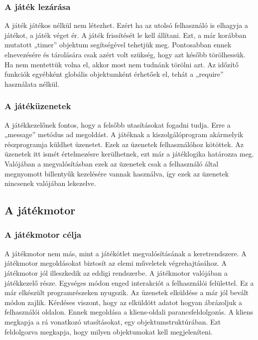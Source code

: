 \documentclass[]{article}
\begin{document}
\hypertarget{a-juxe1tuxe9k-lezuxe1ruxe1sa}{%
\subsubsection{A játék lezárása}\label{a-juxe1tuxe9k-lezuxe1ruxe1sa}}

A játék játékos nélkül nem létezhet. Ezért ha az utolsó felhasználó is
elhagyja a játékot, a játék véget ér. A játék frissítését le kell
állítani. Ezt, a már korábban mutatott „timer'' objektum segítségével
tehetjük meg. Pontosabban ennek elnevezésére és tárolására csak azért
volt szükség, hogy azt később törölhessük. Ha nem mentettük volna el,
akkor most nem tudnánk törölni azt. Az időzítő funkciók egyébként
globális objektumként érhetőek el, tehát a „require'' használata nélkül.

\hypertarget{a-juxe1tuxe9kuxfczenetek}{%
\subsubsection{A játéküzenetek}\label{a-juxe1tuxe9kuxfczenetek}}

A játékkezelőnek fontos, hogy a felsőbb utasításokat fogadni tudja. Erre
a „message'' metódus ad megoldást. A játéknak a kiszolgálóprogram
akármelyik részprogramja küldhet üzenetet. Ezek az üzenetek
felhasználóhoz kötöttek. Az üzenetek itt ismét értelmezésre kerülhetnek,
ezt már a játéklogika határozza meg. Valójában a megvalósításban ezek az
üzenetek csak a felhasználó által megnyomott billentyűk kezelésére
vannak használva, így ezek az üzenetek nincsenek valójában lekezelve.

\hypertarget{a-juxe1tuxe9kmotor}{%
\subsection{A játékmotor}\label{a-juxe1tuxe9kmotor}}

\hypertarget{a-juxe1tuxe9kmotor-cuxe9lja}{%
\subsubsection{A játékmotor célja}\label{a-juxe1tuxe9kmotor-cuxe9lja}}

A játékmotor nem más, mint a játékötlet megvalósításának a
keretrendszere. A játékmotor megoldásokat biztosít az elemi műveletek
végrehajtásához. A játékmotor jól illeszkedik az eddigi rendszerbe. A
játékmotor valójában a játékkezelő része. Egységes módon enged
interakciót a felhasználói felülettel. Ez a már elkészült
programrészeken nyugszik. Az üzenetek elküldése a már jól bevált módon
zajlik. Kérdéses viszont, hogy az elküldött adatot hogyan ábrázoljuk a
felhasználói oldalon. Ennek megoldása a kliens-oldali
parancsfeldolgozás. A kliens megkapja a rá vonatkozó utasításokat, egy
objektumstruktúrában. Ezt feldolgozva megkapja, hogy milyen objektumokat
kell megjeleníteni.
\end{document}
